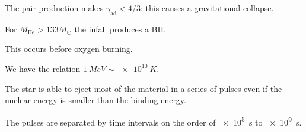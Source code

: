 \documentclass[main.tex]{subfiles}
\begin{document}

The pair production makes \(\gamma _{\text{ad}} < 4/3\): this causes a gravitational collapse. 

For \(M _{\text{He}} > 133 M_{\odot}\) the infall produces a BH.

This occurs before oxygen burning. 

We have the relation \(\SI{1}{MeV} \sim \SI{e10}{K}\). 

The star is able to eject most of the material in a series of pulses even if the nuclear energy is smaller than the binding energy. 

The pulses are separated by time intervals on the order of \SI{e5}{s} to \SI{e9}{s}.  
\end{document}

